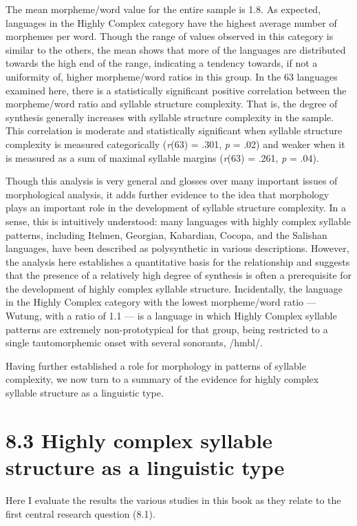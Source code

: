   The mean morpheme/word value for the entire sample is 1.8. As expected, languages in the Highly Complex category have the highest average number of morphemes per word. Though the range of values observed in this category is similar to the others, the mean shows that more of the languages are distributed towards the high end of the range, indicating a tendency towards, if not a uniformity of, higher morpheme/word ratios in this group. In the 63 languages examined here, there is a statistically significant positive correlation between the morpheme/word ratio and syllable structure complexity. That is, the degree of synthesis generally increases with syllable structure complexity in the sample. This correlation is moderate and statistically significant when syllable structure complexity is measured categorically (\textit{r}(63) = .301, \textit{p} = .02) and weaker when it is measured as a sum of maximal syllable margins (\textit{r}(63) = .261, \textit{p} = .04).

  Though this analysis is very general and glosses over many important issues of morphological analysis, it adds further evidence to the idea that morphology plays an important role in the development of syllable structure complexity. In a sense, this is intuitively understood: many languages with highly complex syllable patterns, including Itelmen, Georgian, Kabardian, Cocopa, and the Salishan languages, have been described as polysynthetic in various descriptions. However, the analysis here establishes a quantitative basis for the relationship and suggests that the presence of a relatively high degree of synthesis is often a prerequisite for the development of highly complex syllable structure. Incidentally, the language in the Highly Complex category with the lowest morpheme/word ratio — Wutung, with a ratio of 1.1 — is a language in which Highly Complex syllable patterns are extremely non-prototypical for that group, being restricted to a single tautomorphemic onset with several sonorants, /hmbl/.

  Having further established a role for morphology in patterns of syllable complexity, we now turn to a summary of the evidence for highly complex syllable structure as a linguistic type.

\section{8.3 Highly complex syllable structure as a linguistic type}

  Here I evaluate the results the various studies in this book as they relate to the first central research question (8.1).

